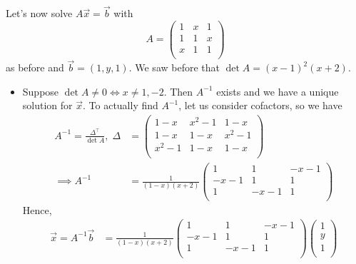 \documentclass{../template/note}
\begin{document}
    \begin{example}
        Let's now solve \(A \vec x = \vec b\) with
        \[
            A = \begin{pmatrix}
             1 & x & 1 \\
             1 & 1 & x \\
             x & 1 & 1 \\
            \end{pmatrix}
        \]
        as before and \(\vec b = (1, y, 1)\). We saw before that \(\det A = (x-1)^2(x+2)\).
        \begin{itemize}
            \item Suppose \(\det A \neq 0 \iff x \neq 1, -2\). Then \(A^{-1}\) exists and we have a unique solution for \(\vec x\). To actually find \(A^{-1}\), let us consider cofactors, so we have
            \begin{align*}
                A^{-1} = \frac{\Delta^\intercal}{\det A}, \; \Delta &= \begin{pmatrix}
                 1-x & x^2-1 & 1-x \\
                 1-x & 1-x & x^2-1 \\
                 x^2-1 & 1-x & 1-x \\
                \end{pmatrix} \\
                \implies A^{-1} &= \frac{1}{(1-x)(x+2)} \begin{pmatrix}
                 1 & 1 & -x-1 \\
                 -x-1 & 1 & 1 \\
                 1 & -x-1 & 1 \\
                \end{pmatrix}
            \end{align*}
            Hence,
            \begin{align*}
                \vec x = A^{-1} \vec b &= \frac{1}{(1-x)(x+2)} \begin{pmatrix}
                 1 & 1 & -x-1 \\
                 -x-1 & 1 & 1 \\
                 1 & -x-1 & 1 \\
                \end{pmatrix} \begin{pmatrix}
                 1 \\
                 y \\
                 1 \\

\end{pmatrix}
\end{align*}
\end{itemize}
\end{example}
\end{document}
